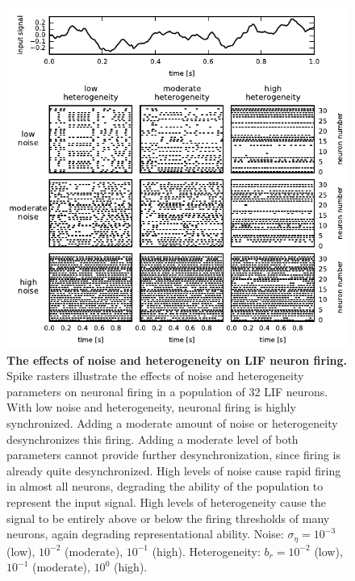 \documentclass[12pt]{article}
\begin{document}
\begin{figure}
  \ifx\hidefigures\undefined
    \centering
    \includegraphics[width=\textwidth]{figure6_syncraster.pdf}
  \fi
  \caption{
    \textbf{The effects of noise and heterogeneity on LIF neuron firing.}
    Spike rasters illustrate the effects of noise and heterogeneity parameters on neuronal firing in a population of 32 LIF neurons. With low noise and heterogeneity, neuronal firing is highly synchronized. Adding a moderate amount of noise or heterogeneity desynchronizes this firing. Adding a moderate level of both parameters cannot provide further desynchronization, since firing is already quite desynchronized. High levels of noise cause rapid firing in almost all neurons, degrading the ability of the population to represent the input signal. High levels of heterogeneity cause the signal to be entirely above or below the firing thresholds of many neurons, again degrading representational ability. Noise: $\sigma_\eta = $$10^{-3}$ (low), $10^{-2}$ (moderate), $10^{-1}$ (high). Heterogeneity: $b_r = $$10^{-2}$ (low), $10^{-1}$ (moderate), $10^{0}$ (high).
  }
  \label{fig:syncraster}
\end{figure}
\end{document}
